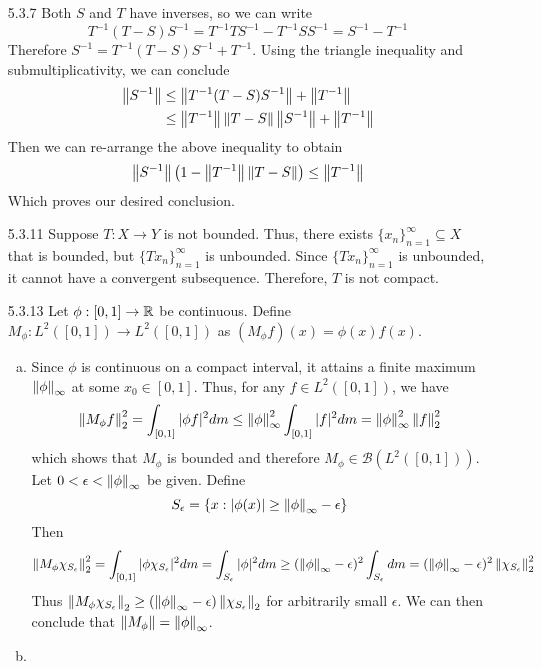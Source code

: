 \documentclass[../../Solutions.tex]{subfiles}
\begin{document}
\begin{itemize}
	\item [5.3.7] Both $S$ and $T$ have inverses, so we can write
		$$ T^{-1}(T-S)S^{-1} = T^{-1}TS^{-1} - T^{-1}SS^{-1} = S^{-1} - T^{-1} $$
		Therefore $S^{-1} = T^{-1}(T-S)S^{-1} + T^{-1}$.
		Using the triangle inequality and submultiplicativity, we can conclude
		\begin{align*}
			\left\lVert S^{-1}\right\rVert &\leq \left\lVert T^{-1}(T-S)S^{-1}\right\rVert + \left\lVert T^{-1}\right\rVert \\
				&\leq \left\lVert T^{-1}\right\rVert\left\lVert T-S\right\rVert\left\lVert S^{-1}\right\rVert + \left\lVert T^{-1}\right\rVert
		\end{align*}
		Then we can re-arrange the above inequality to obtain
		\begin{equation*}
			\left\lVert S^{-1}\right\rVert\left(1-\left\lVert T^{-1}\right\rVert\left\lVert T-S\right\rVert\right) \leq \left\lVert T^{-1}\right\rVert
		\end{equation*}
		Which proves our desired conclusion.
	
	\item [5.3.11] Suppose $T:X\to Y$ is not bounded.
		Thus, there exists $\{x_n\}_{n=1}^\infty \subseteq X$ that is bounded, but $\{Tx_n\}_{n=1}^\infty$ is unbounded.
		Since $\{Tx_n\}_{n=1}^\infty$ is unbounded, it cannot have a convergent subsequence.
		Therefore, $T$ is not compact.
	
	\item [5.3.13] Let $\phi:[0,1]\to\mathbb{R}$ be continuous.
		Define $M_\phi:L^2([0,1])\to L^2([0,1])$ as $(M_\phi f)(x) = \phi(x)f(x)$.
		\begin{enumerate}[(a)]
			\item Since $\phi$ is continuous on a compact interval, it attains a finite maximum $\left\lVert\phi\right\rVert_\infty$ at some $x_0 \in [0,1]$.
				Thus, for any $f \in L^2([0,1])$, we have
				$$ \left\lVert M_\phi f\right\rVert_2^2 = \int_{[0,1]} |\phi f|^2 dm \leq \left\lVert\phi\right\rVert_\infty^2 \int_{[0,1]} |f|^2 dm = \left\lVert\phi\right\rVert_\infty^2 \left\lVert f\right\rVert_2^2 $$
				which shows that $M_\phi$ is bounded and therefore $M_\phi \in \mathcal{B}\left(L^2([0,1])\right)$.
				Let $0 < \epsilon < \left\lVert\phi\right\rVert_\infty$ be given.
				Define
				$$ S_\epsilon = \{x : |\phi(x)| \geq \left\lVert\phi\right\rVert_\infty-\epsilon\} $$
				Then
				$$ \left\lVert M_\phi \chi_{S_\epsilon}\right\rVert_2^2 = \int_{[0,1]} |\phi \chi_{S_\epsilon}|^2 dm = \int_{S_\epsilon} |\phi|^2 dm \geq (\left\lVert\phi\right\rVert_\infty - \epsilon)^2 \int_{S_\epsilon} dm = (\left\lVert\phi\right\rVert_\infty - \epsilon)^2 \left\lVert\chi_{S_\epsilon}\right\rVert_2^2 $$
				Thus $\left\lVert M_\phi \chi_{S_\epsilon}\right\rVert_2 \geq (\left\lVert\phi\right\rVert_\infty - \epsilon)\left\lVert\chi_{S_\epsilon}\right\rVert_2$ for arbitrarily small $\epsilon$.
				We can then conclude that $\left\lVert M_\phi\right\rVert = \left\lVert\phi\right\rVert_\infty$.
			\item 
		\end{enumerate}
	
\end{itemize}
\end{document}
